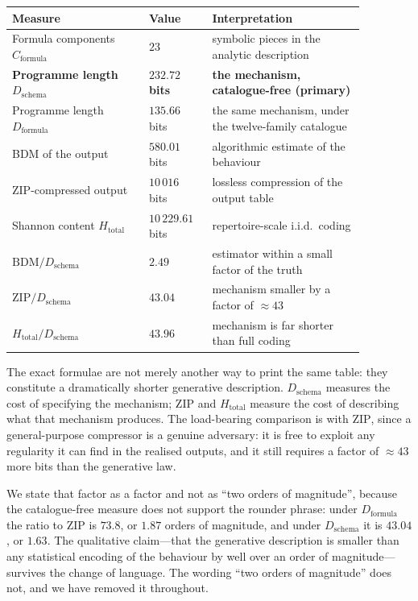 \documentclass[11pt]{article}
\begin{document}
\begin{center}
\small
\begin{tabular}{@{}p{0.34\linewidth}p{0.15\linewidth}p{0.38\linewidth}@{}}
\toprule
\textbf{Measure} & \textbf{Value} & \textbf{Interpretation} \\
\midrule
Formula components $C_{\mathrm{formula}}$ & $23$
  & symbolic pieces in the analytic description \\
\textbf{Programme length} $D_{\mathrm{schema}}$ & $\mathbf{232.72}$ \textbf{bits}
  & \textbf{the mechanism, catalogue-free (primary)} \\
Programme length $D_{\mathrm{formula}}$ & $135.66$ bits
  & the same mechanism, under the twelve-family catalogue \\
BDM of the output & $580.01$ bits
  & algorithmic estimate of the behaviour \\
ZIP-compressed output & $10\,016$ bits
  & lossless compression of the output table \\
Shannon content $H_{\mathrm{total}}$ & $10\,229.61$ bits
  & repertoire-scale i.i.d.\ coding \\
$\mathrm{BDM}/D_{\mathrm{schema}}$ & $2.49$
  & estimator within a small factor of the truth \\
$\mathrm{ZIP}/D_{\mathrm{schema}}$ & $43.04$
  & mechanism smaller by a factor of ${\approx}43$ \\
$H_{\mathrm{total}}/D_{\mathrm{schema}}$ & $43.96$
  & mechanism is far shorter than full coding \\
\bottomrule
\end{tabular}
\end{center}

The exact formulae are not merely another way to print the same table:
they constitute a dramatically shorter generative description.
$D_{\mathrm{schema}}$ measures the cost of specifying the mechanism;
$\mathrm{ZIP}$ and $H_{\mathrm{total}}$ measure the cost of describing what that
mechanism produces.  The load-bearing comparison is with $\mathrm{ZIP}$, since a
general-purpose compressor is a genuine adversary: it is free to exploit any
regularity it can find in the realised outputs, and it still requires a factor
of ${\approx}43$ more bits than the generative law.

We state that factor as a factor and not as ``two orders of magnitude'',
because the catalogue-free measure does not support the rounder phrase: under
$D_{\mathrm{formula}}$ the ratio to $\mathrm{ZIP}$ is $73.8$, or $1.87$ orders
of magnitude, and under $D_{\mathrm{schema}}$ it is $43.04$, or $1.63$.  The
qualitative claim---that the generative description is smaller than any
statistical encoding of the behaviour by well over an order of
magnitude---survives the change of language.  The wording ``two orders of
magnitude'' does not, and we have removed it throughout.
\end{document}
